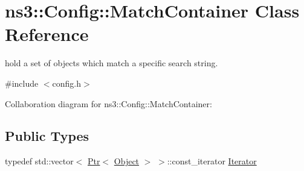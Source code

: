 \hypertarget{classns3_1_1Config_1_1MatchContainer}{}\section{ns3\+:\+:Config\+:\+:Match\+Container Class Reference}
\label{classns3_1_1Config_1_1MatchContainer}


hold a set of objects which match a specific search string.  




{\ttfamily \#include $<$config.\+h$>$}



Collaboration diagram for ns3\+:\+:Config\+:\+:Match\+Container\+:
\subsection*{Public Types}
\begin{DoxyCompactItemize}
\item 
typedef std\+::vector$<$ \hyperlink{classns3_1_1Ptr}{Ptr}$<$ \hyperlink{classns3_1_1Object}{Object} $>$ $>$\+::const\+\_\+iterator \hyperlink{classns3_1_1Config_1_1MatchContainer_a00de4b7cc8ea02e8e33209f92e65fa0f}{Iterator}
\end{DoxyCompactItemize}

